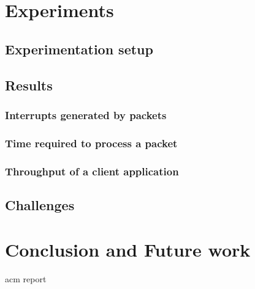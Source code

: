 \documentclass[a4paper,11pt]{report}
\begin{document}
\chapter{Experiments}
\section{Experimentation setup}
\section{Results}
\subsection{Interrupts generated by packets}
\subsection{Time required to process a packet}
\subsection{Throughput of a client application}
\section{Challenges}

\chapter{Conclusion and Future work}

\newpage
 {acm}
 {report}
\end{document}
